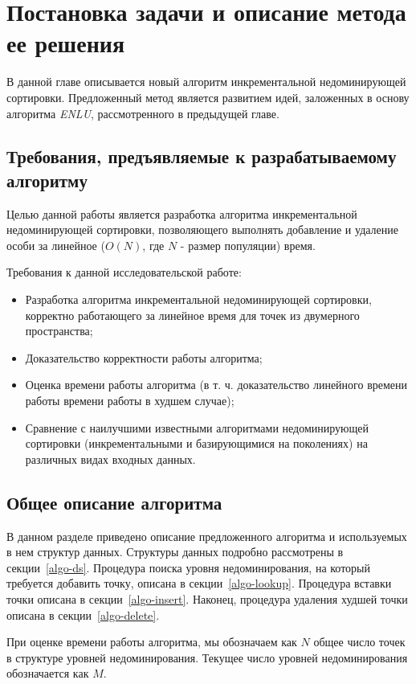 \chapter{Постановка задачи и описание метода ее решения}
\label{chapter2}

В данной главе описывается новый алгоритм инкрементальной недоминирующей сортировки. Предложенный
метод является развитием идей, заложенных в основу алгоритма \textit{ENLU}, рассмотренного в
предыдущей главе.

\section{Требования, предъявляемые к разрабатываемому алгоритму}
\label{reqs}
Целью данной работы является разработка алгоритма инкрементальной недоминирующей сортировки, позволяющего
выполнять добавление и удаление особи за линейное ($O(N)$, где $N$ - размер популяции) время.

Требования к данной исследовательской работе:
\begin{itemize}
	\item Разработка алгоритма инкрементальной недоминирующей сортировки, корректно работающего
	за линейное время для точек из двумерного пространства;
	\item Доказательство корректности работы алгоритма;
	\item Оценка времени работы алгоритма (в т. ч. доказательство линейного времени работы времени
	работы в худшем случае);
	\item Сравнение с наилучшими известными алгоритмами недоминирующей сортировки (инкрементальными
	и базирующимися на поколениях) на различных видах входных данных.
\end{itemize}

\section{Общее описание алгоритма}
\label{gen_desc}
В данном разделе приведено описание предложенного алгоритма и используемых в нем структур данных.
Структуры данных подробно рассмотрены в секции~\ref{algo-ds}.
Процедура поиска уровня недоминирования, на который требуется добавить точку, 
описана в секции~\ref{algo-lookup}.
Процедура вставки точки описана в секции~\ref{algo-insert}.
Наконец, процедура удаления худшей точки описана в секции~\ref{algo-delete}.

При оценке времени работы алгоритма, мы обозначаем как $N$ общее число точек в структуре уровней
недоминирования. Текущее число уровней недоминирования обозначается как $M$.

